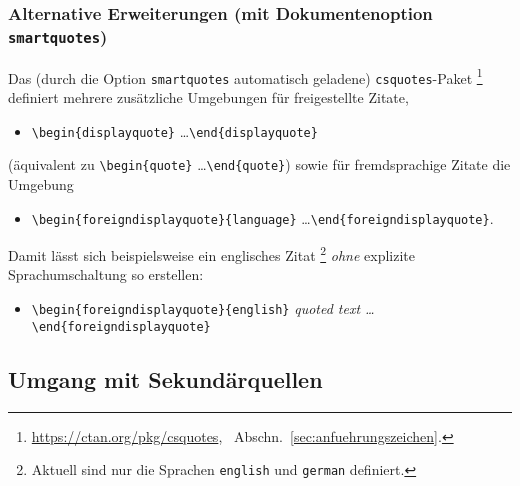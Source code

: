 \subsubsection{Alternative Erweiterungen (mit Dokumentenoption \texttt{smartquotes})}
Das (durch die Option \texttt{smartquotes} automatisch geladene) \texttt{csquotes}-Paket%
\footnote{\url{https://ctan.org/pkg/csquotes}, \sa\ Abschn.\ \ref{sec:anfuehrungszeichen}.}
definiert mehrere zusätzliche Umgebungen für freigestellte
Zitate, \zB\ 
\begin{itemize}
 \item[] \verb!\begin{displayquote}! \ldots \verb!\end{displayquote}!
\end{itemize}
(äquivalent zu \verb!\begin{quote}! \ldots \verb!\end{quote}!) sowie für fremdsprachige Zitate die Umgebung
\begin{itemize}
 \item[] \verb!\begin{foreigndisplayquote}{language}! \ldots \verb!\end{foreigndisplayquote}!.
\end{itemize}
Damit lässt sich beispielsweise ein englisches Zitat%
\footnote{Aktuell sind nur die Sprachen \texttt{english} und \texttt{german} definiert.}
\emph{ohne} explizite Sprachumschaltung
so erstellen:
\begin{itemize}
 \item[] \verb!\begin{foreigndisplayquote}{english}!\newline
	\emph{quoted text \ldots}\newline
	\verb!\end{foreigndisplayquote}!
\end{itemize}


\subsection{Umgang mit Sekundärquellen}

